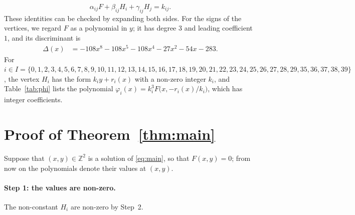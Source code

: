 \documentclass[11pt]{article}
\newcommand{\Z}{\mathbb{Z}}
\begin{document}
\begin{equation}\label{eq:sep}
\alpha_{ij}F+\beta_{ij}H_i+\gamma_{ij}H_j=k_{ij}.
\end{equation}
These identities can be checked by expanding both sides.
For the signs of the vertices, we regard $F$ as a polynomial in $y$; it has degree $3$ and leading coefficient $1$, and its discriminant is
\begin{align*}
\Delta(x)&=-108x^{8}-108x^{5}-108x^{4}-27x^{2}-54x-283.
\end{align*}
For $i\in I=\{0,\allowbreak 1,\allowbreak 2,\allowbreak 3,\allowbreak 4,\allowbreak 5,\allowbreak 6,\allowbreak 7,\allowbreak 8,\allowbreak 9,\allowbreak 10,\allowbreak 11,\allowbreak 12,\allowbreak 13,\allowbreak 14,\allowbreak 15,\allowbreak 16,\allowbreak 17,\allowbreak 18,\allowbreak 19,\allowbreak 20,\allowbreak 21,\allowbreak 22,\allowbreak 23,\allowbreak 24,\allowbreak 25,\allowbreak 26,\allowbreak 27,\allowbreak 28,\allowbreak 29,\allowbreak 35,\allowbreak 36,\allowbreak 37,\allowbreak 38,\allowbreak 39\}$, the vertex $H_i$ has the form $k_iy+r_i(x)$ with a non-zero integer $k_i$, and Table~\ref{tab:phi} lists the polynomial $\varphi_i(x)=k_i^3F\bigl(x,-r_i(x)/k_i\bigr)$, which has integer coefficients.

\section{Proof of Theorem~\ref{thm:main}}

Suppose that $(x,y)\in\Z^2$ is a solution of \eqref{eq:main}, so that $F(x,y)=0$; from now on the polynomials denote their values at $(x,y)$.
\paragraph{Step 1: the values are non-zero.} The non-constant $H_i$ are non-zero by Step~2.
\end{document}
